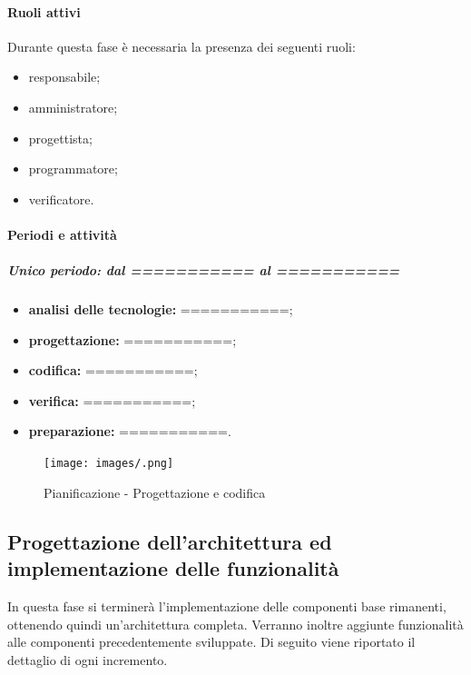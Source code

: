 \paragraph{Ruoli attivi}
Durante questa fase è necessaria la presenza dei seguenti ruoli: 
\begin{itemize} 
	\item responsabile; 
	\item amministratore; 
	\item progettista; 
	\item programmatore; 
	\item verificatore.
\end{itemize}

\paragraph{Periodi e attività}
\subparagraph{Unico periodo: dal =========== al ===========}
\begin{itemize}
	\item \textbf{analisi delle tecnologie:} ===========;
	\item \textbf{progettazione:} ===========;
	\item \textbf{codifica:} ===========;
	\item \textbf{verifica:} ===========;
	\item \textbf{preparazione:} ===========.
\end{itemize}
 
\newpage 

\begin{landscape} 
	\begin{figure}[h!] 
		\texttt{[image: images/.png]} 
		\caption{Pianificazione - Progettazione e codifica} 
	\end{figure} 
\end{landscape} 

\newpage 

 
\subsection{Progettazione dell'architettura ed implementazione delle funzionalità}
In questa fase si terminerà l'implementazione delle componenti base rimanenti, ottenendo quindi un'architettura completa. Verranno inoltre aggiunte funzionalità alle componenti precedentemente sviluppate.
\newline
Di seguito viene riportato il dettaglio di ogni incremento.


